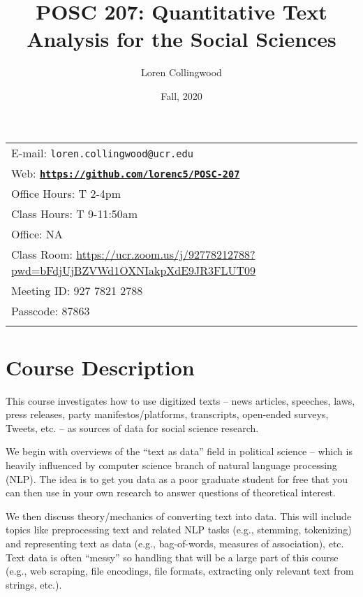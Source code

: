 \documentclass[11pt]{article}
\title{POSC 207: Quantitative Text Analysis for the Social Sciences}
\author{Loren Collingwood}
\date{Fall, 2020}
\newcommand{\blankline}{\quad\pagebreak[2]}
\begin{document}
\maketitle

\blankline

\begin{tabular*}{.93\textwidth}{@{\extracolsep{\fill}}lr}


E-mail: \texttt{loren.collingwood@ucr.edu} \\
Web: \href{https://github.com/lorenc5/POSC-207}{\tt\bf https://github.com/lorenc5/POSC-207}  \\
Office Hours: T 2-4pm \\ 
Class Hours: T 9-11:50am \\
Office: NA \\ 
Class Room: \href{https://ucr.zoom.us/j/92778212788?pwd=bFdjUjBZVWd1OXNIakpXdE9JR3FLUT09}{https://ucr.zoom.us/j/92778212788?pwd=bFdjUjBZVWd1OXNIakpXdE9JR3FLUT09} \\
Meeting ID:  927 7821 2788 \\
Passcode:  87863 \\
&  \\
\hline
\end{tabular*}

\vspace{5 mm}


\section*{Course Description}

This course investigates how to use digitized texts -- news articles, speeches, laws, press releases, party manifestos/platforms, transcripts, open-ended surveys, Tweets, etc. -- as sources of data for social science research.

We begin with overviews of the ``text as data'' field in political science -- which is heavily influenced by computer science branch of natural language processing (NLP). The idea is to get you data as a poor graduate student for free that you can then use in your own research to answer questions of theoretical interest.

We then discuss theory/mechanics of converting text into data. This will include topics like preprocessing text and related NLP tasks (e.g., stemming, tokenizing) and representing text as data (e.g., bag-of-words, measures of association), etc. Text data is often ``messy'' so handling that will be a large part of this course (e.g., web scraping, file encodings, file formats, extracting only relevant text from strings, etc.).
\end{document}
